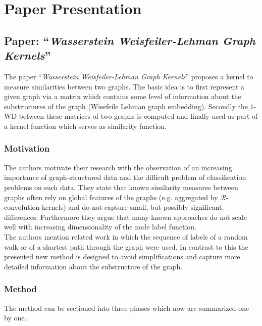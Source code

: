 \documentclass[twoside,twocolumn]{scrartcl}
\begin{document}
\section{Paper Presentation}

\subsection{Paper: \enquote{\textit{Wasserstein Weisfeiler-Lehman Graph Kernels}}} %
The paper \enquote{\textit{Wasserstein Weisfeiler-Lehman Graph Kernels}} proposes a kernel to measure similarities between two graphs. The basic idea is to first represent a given graph via a matrix which contains some level of information about the substructures of the graph (Wiesfeile Lehman graph embedding). Secondly the $1$-WD between these matrices of two graphs is computed and finally used as part of a kernel function which serves as similarity function.

\subsubsection{Motivation}
The authors motivate their research with the observation of an increasing importance of graph-structured data and the difficult problem of classification problems on such data. They state that known similarity measures between graphs often rely on global features of the graphs (e.g. aggregated by $\mathcal{R}$-convolution kernels) and do not capture small, but possibly significant, differences. Furthermore they argue that many known approaches do not scale well with increasing dimensionality of the node label function.\\

The authors mention related work in which the sequence of labels of a random walk or of a shortest path through the graph were used. In contrast to this the presented new method is designed to avoid simplifications and capture more detailed information about the substructure of the graph.

\subsubsection{Method}
The method can be sectioned into three phases which now are summarized one by one.
\end{document}
